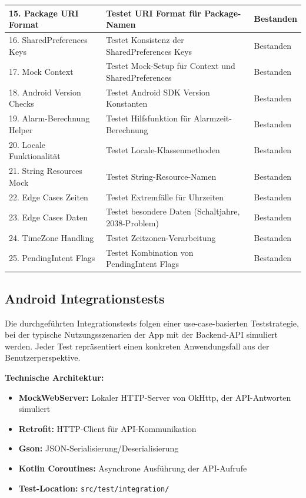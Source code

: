 \begin{tabularx}{\textwidth}{|l|X|l|}
\hline
15. Package URI Format & Testet URI Format für Package-Namen & Bestanden\\
\hline
16. SharedPreferences Keys & Testet Konsistenz der SharedPreferences Keys & Bestanden\\
\hline
17. Mock Context & Testet Mock-Setup für Context und SharedPreferences & Bestanden\\
\hline
18. Android Version Checks & Testet Android SDK Version Konstanten & Bestanden\\
\hline
19. Alarm-Berechnung Helper & Testet Hilfsfunktion für Alarmzeit-Berechnung & Bestanden\\
\hline
20. Locale Funktionalität & Testet Locale-Klassenmethoden & Bestanden\\
\hline
21. String Resources Mock & Testet String-Resource-Namen & Bestanden\\
\hline
22. Edge Cases Zeiten & Testet Extremfälle für Uhrzeiten & Bestanden\\
\hline
23. Edge Cases Daten & Testet besondere Daten (Schaltjahre, 2038-Problem) & Bestanden\\
\hline
24. TimeZone Handling & Testet Zeitzonen-Verarbeitung & Bestanden\\
\hline
25. PendingIntent Flags & Testet Kombination von PendingIntent Flags & Bestanden\\
\hline
\end{tabularx}
\subsection{Android Integrationstests}
Die durchgeführten Integrationstests folgen einer use-case-basierten Teststrategie, 
bei der typische Nutzungsszenarien der App mit der Backend-API simuliert werden. 
Jeder Test repräsentiert einen konkreten Anwendungsfall aus der Benutzerperspektive.

\noindent\textbf{Technische Architektur:}

\begin{itemize}
  \item \textbf{MockWebServer:} Lokaler HTTP-Server von OkHttp, der API-Antworten simuliert
  \item \textbf{Retrofit:} HTTP-Client für API-Kommunikation
  \item \textbf{Gson:} JSON-Serialisierung/Deserialisierung
  \item \textbf{Kotlin Coroutines:} Asynchrone Ausführung der API-Aufrufe
  \item \textbf{Test-Location:} \texttt{src/test/integration/}
\end{itemize}


